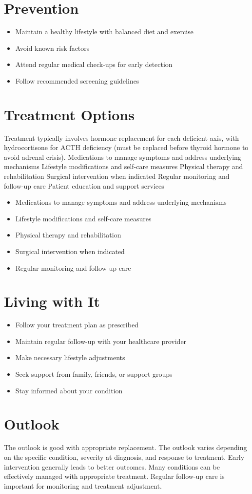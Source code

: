 \section{Prevention}
\begin{itemize}[noitemsep]
  \item Maintain a healthy lifestyle with balanced diet and exercise
  \item Avoid known risk factors
  \item Attend regular medical check-ups for early detection
  \item Follow recommended screening guidelines
\end{itemize}
\section{Treatment Options}
Treatment typically involves hormone replacement for each deficient axis, with hydrocortisone for ACTH deficiency (must be replaced before thyroid hormone to avoid adrenal crisis). Medications to manage symptoms and address underlying mechanisms Lifestyle modifications and self-care measures Physical therapy and rehabilitation Surgical intervention when indicated Regular monitoring and follow-up care Patient education and support services

\begin{itemize}[noitemsep]
  \item Medications to manage symptoms and address underlying mechanisms
  \item Lifestyle modifications and self-care measures
  \item Physical therapy and rehabilitation
  \item Surgical intervention when indicated
  \item Regular monitoring and follow-up care
\end{itemize}
\section{Living with It}
\begin{itemize}[noitemsep]
  \item Follow your treatment plan as prescribed
  \item Maintain regular follow-up with your healthcare provider
  \item Make necessary lifestyle adjustments
  \item Seek support from family, friends, or support groups
  \item Stay informed about your condition
\end{itemize}
\section{Outlook}
The outlook is good with appropriate replacement. The outlook varies depending on the specific condition, severity at diagnosis, and response to treatment. Early intervention generally leads to better outcomes. Many conditions can be effectively managed with appropriate treatment. Regular follow-up care is important for monitoring and treatment adjustment.
